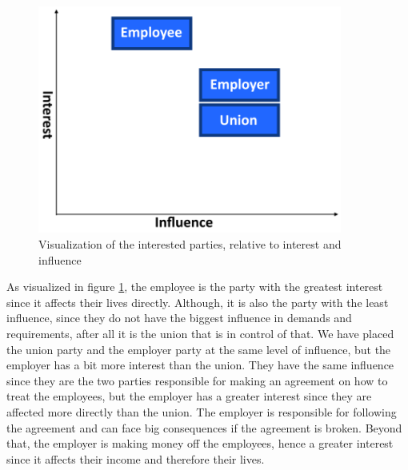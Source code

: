 \begin{figure}[ht!]
    \centering
    \includegraphics[width=100mm]{media/Interested Parties.png}
    \caption{Visualization of the interested parties, relative to interest and influence}
    \label{fig:Interested parties graph}
\end{figure}

As visualized in figure \ref{fig:Interested parties graph}, the employee is the party with the greatest interest since it affects their lives directly. Although, it is also the party with the least influence, since they do not have the biggest influence in demands and requirements, after all it is the union that is in control of that. We have placed the union party and the employer party at the same level of influence, but the employer has a bit more interest than the union. They have the same influence since they are the two parties responsible for making an agreement on how to treat the employees, but the employer has a greater interest since they are affected more directly than the union. The employer is responsible for following the agreement and can face big consequences if the agreement is broken. Beyond that, the employer is making money off the employees, hence a greater interest since it affects their income and therefore their lives.
